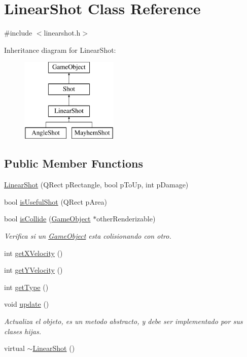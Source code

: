 \hypertarget{class_linear_shot}{\section{Linear\-Shot Class Reference}
\label{class_linear_shot}
}


{\ttfamily \#include $<$linearshot.\-h$>$}

Inheritance diagram for Linear\-Shot\-:\begin{figure}[H]
\begin{center}
\leavevmode
\includegraphics[height=4.000000cm]{class_linear_shot}
\end{center}
\end{figure}
\subsection*{Public Member Functions}
\begin{DoxyCompactItemize}
\item 
\hyperlink{class_linear_shot_a353b1988983a192affd6913805b8403e}{Linear\-Shot} (Q\-Rect p\-Rectangle, bool p\-To\-Up, int p\-Damage)
\item 
bool \hyperlink{class_linear_shot_af5e24419776495f3b42381fe614a3bec}{is\-Useful\-Shot} (Q\-Rect p\-Area)
\item 
bool \hyperlink{class_linear_shot_a5f74863ef2fe90a8e524945737029e0a}{is\-Collide} (\hyperlink{class_game_object}{Game\-Object} $\ast$other\-Renderizable)
\begin{DoxyCompactList}\small\item\em Verifica si un \hyperlink{class_game_object}{Game\-Object} esta colisionando con otro. \end{DoxyCompactList}\item 
int \hyperlink{class_linear_shot_a9f7b9d654314185d6d89c8c24a64bc85}{get\-X\-Velocity} ()
\item 
int \hyperlink{class_linear_shot_ad0b2c8f2e67c4c8bf48895616c9f5683}{get\-Y\-Velocity} ()
\item 
int \hyperlink{class_linear_shot_a50717d095ffb35f445f909f0ef961a5a}{get\-Type} ()
\item 
void \hyperlink{class_linear_shot_a7f0ae98813020ba9c1860f24750b6fcf}{update} ()
\begin{DoxyCompactList}\small\item\em Actualiza el objeto, es un metodo abstracto, y debe ser implementado por sus clases hijas. \end{DoxyCompactList}\item 
virtual \hyperlink{class_linear_shot_a3473e5a630bdd3d2d85e59899e66d0b5}{$\sim$\-Linear\-Shot} ()
\end{DoxyCompactItemize}

